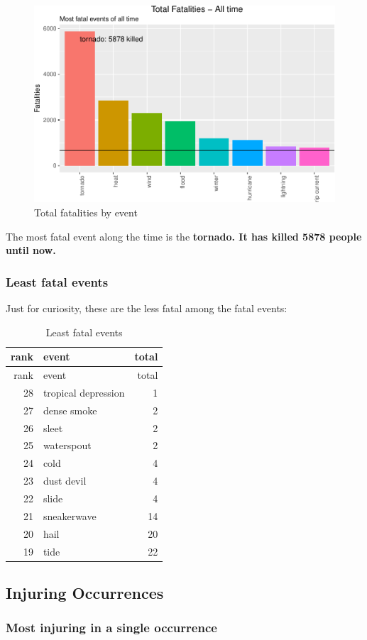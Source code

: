 \documentclass[]{article}
\begin{document}
\begin{figure}[htbp]
\centering
\includegraphics{readme_files/figure-latex/fatal-plot-alltime-1.pdf}
\caption{Total fatalities by event}
\end{figure}

The most fatal event along the time is the \textbf{tornado. It has
killed 5878 people until now.}

\subsubsection{Least fatal events}\label{least-fatal-events}

Just for curiosity, these are the less fatal among the fatal events:

\begin{longtable}[]{@{}rlr@{}}
\caption{Least fatal events}\tabularnewline
\toprule
rank & event & total\tabularnewline
\midrule
\endfirsthead
\toprule
rank & event & total\tabularnewline
\midrule
\endhead
28 & tropical depression & 1\tabularnewline
27 & dense smoke & 2\tabularnewline
26 & sleet & 2\tabularnewline
25 & waterspout & 2\tabularnewline
24 & cold & 4\tabularnewline
23 & dust devil & 4\tabularnewline
22 & slide & 4\tabularnewline
21 & sneakerwave & 14\tabularnewline
20 & hail & 20\tabularnewline
19 & tide & 22\tabularnewline
\bottomrule
\end{longtable}

\subsection{Injuring Occurrences}\label{injuring-occurrences}

\subsubsection{Most injuring in a single
occurrence}\label{most-injuring-in-a-single-occurrence}
\end{document}
